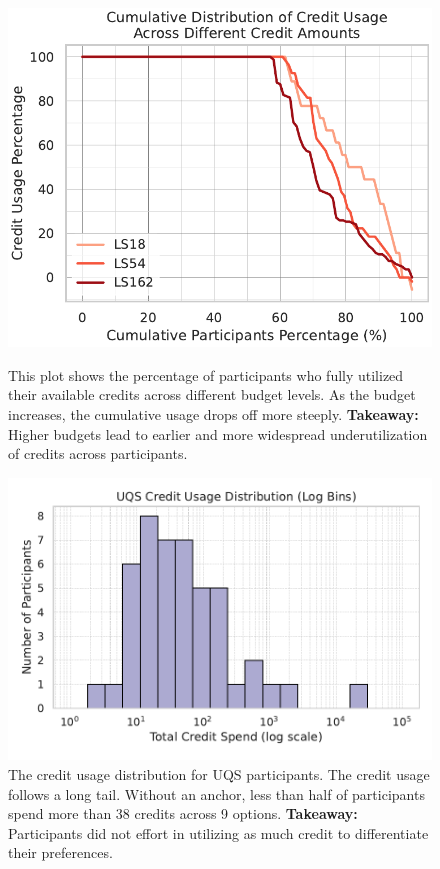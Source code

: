 \begin{figure}[ht]
  \centering

  \begin{minipage}[t]{0.48\textwidth}
    \centering
    \includegraphics[width=\textwidth]{content/image/cumulative_distribution_credit_usage.pdf}
    \caption{
    This plot shows the percentage of participants who fully utilized their available credits across different budget levels. As the budget increases, the cumulative usage drops off more steeply.
    \textbf{Takeaway:} Higher budgets lead to earlier and more widespread underutilization of credits across participants.
    }
    \label{fig:credit_usage_descending}
  \end{minipage}
  \hfill
  \begin{minipage}[t]{0.48\textwidth}
    \centering
    \includegraphics[width=\textwidth]{content/image/uqs_credit_usage_distribution_logbins.pdf}
    \caption{The credit usage distribution for UQS participants. The credit usage follows a long tail. Without an anchor, less than half of participants spend more than 38 credits across 9 options. \textbf{Takeaway:} Participants did not effort in utilizing as much credit to differentiate their preferences.}
    \label{fig:uqs_usage}
  \end{minipage}

\end{figure}


